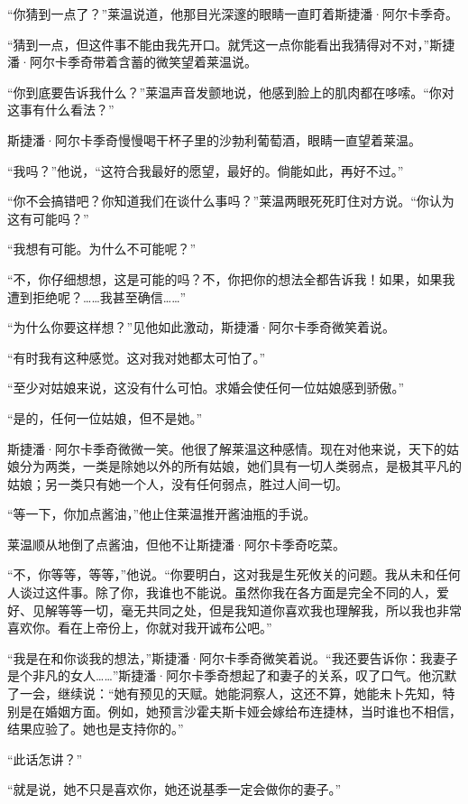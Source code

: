 \par “你猜到一点了？”莱温说道，他那目光深邃的眼睛一直盯着斯捷潘·阿尔卡季奇。
\par “猜到一点，但这件事不能由我先开口。就凭这一点你能看出我猜得对不对，”斯捷潘·阿尔卡季奇带着含蓄的微笑望着莱温说。
\par “你到底要告诉我什么？”莱温声音发颤地说，他感到脸上的肌肉都在哆嗦。“你对这事有什么看法？”
\par 斯捷潘·阿尔卡季奇慢慢喝干杯子里的沙勃利葡萄酒，眼睛一直望着莱温。
\par “我吗？”他说，“这符合我最好的愿望，最好的。倘能如此，再好不过。”
\par “你不会搞错吧？你知道我们在谈什么事吗？”莱温两眼死死盯住对方说。“你认为这有可能吗？”
\par “我想有可能。为什么不可能呢？”
\par “不，你仔细想想，这是可能的吗？不，你把你的想法全都告诉我！如果，如果我遭到拒绝呢？……我甚至确信……”
\par “为什么你要这样想？”见他如此激动，斯捷潘·阿尔卡季奇微笑着说。
\par “有时我有这种感觉。这对我对她都太可怕了。”
\par “至少对姑娘来说，这没有什么可怕。求婚会使任何一位姑娘感到骄傲。”
\par “是的，任何一位姑娘，但不是她。”
\par 斯捷潘·阿尔卡季奇微微一笑。他很了解莱温这种感情。现在对他来说，天下的姑娘分为两类，一类是除她以外的所有姑娘，她们具有一切人类弱点，是极其平凡的姑娘；另一类只有她一个人，没有任何弱点，胜过人间一切。
\par “等一下，你加点酱油，”他止住莱温推开酱油瓶的手说。
\par 莱温顺从地倒了点酱油，但他不让斯捷潘·阿尔卡季奇吃菜。
\par “不，你等等，等等，”他说。“你要明白，这对我是生死攸关的问题。我从未和任何人谈过这件事。除了你，我谁也不能说。虽然你我在各方面是完全不同的人，爱好、见解等等一切，毫无共同之处，但是我知道你喜欢我也理解我，所以我也非常喜欢你。看在上帝份上，你就对我开诚布公吧。”
\par “我是在和你谈我的想法，”斯捷潘·阿尔卡季奇微笑着说。“我还要告诉你：我妻子是个非凡的女人……”斯捷潘·阿尔卡季奇想起了和妻子的关系，叹了口气。他沉默了一会，继续说：“她有预见的天赋。她能洞察人，这还不算，她能未卜先知，特别是在婚姻方面。例如，她预言沙霍夫斯卡娅会嫁给布连捷林，当时谁也不相信，结果应验了。她也是支持你的。”
\par “此话怎讲？”
\par “就是说，她不只是喜欢你，她还说基季一定会做你的妻子。”
